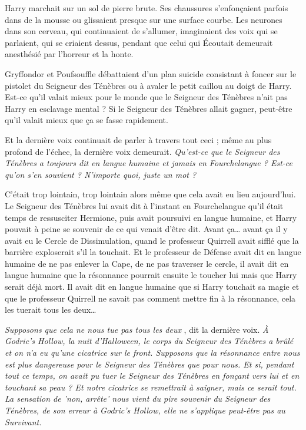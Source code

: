 Harry marchait sur un sol de pierre brute. Ses chaussures s'enfonçaient parfois dans de la mousse ou glissaient presque sur une surface courbe. Les neurones dans son cerveau, qui continuaient de s'allumer, imaginaient des voix qui se parlaient, qui se criaient dessus, pendant que celui qui Écoutait demeurait anesthésié par l'horreur et la honte.

Gryffondor et Poufsouffle débattaient d'un plan suicide consistant à foncer sur le pistolet du Seigneur des Ténèbres ou à avaler le petit caillou au doigt de Harry. Est-ce qu'il valait mieux pour le monde que le Seigneur des Ténèbres n'ait pas Harry en esclavage mental ? Si le Seigneur des Ténèbres allait gagner, peut-être qu'il valait mieux que ça se fasse rapidement.

Et la dernière voix continuait de parler à travers tout ceci ; même au plus profond de l'échec, la dernière voix demeurait. \emph{Qu'est-ce que le Seigneur des Ténèbres a toujours dit en langue humaine et jamais en Fourchelangue ? Est-ce qu'on s'en souvient ? N'importe quoi, juste un mot ?} 

C'était trop lointain, trop lointain alors même que cela avait eu lieu aujourd'hui. Le Seigneur des Ténèbres lui avait dit à l'instant en Fourchelangue qu'il était temps de ressusciter Hermione, puis avait poursuivi en langue humaine, et Harry pouvait à peine se souvenir de ce qui venait d'être dit. Avant ça… avant ça il y avait eu le Cercle de Dissimulation, quand le professeur Quirrell avait sifflé que la barrière exploserait s'il la touchait. Et le professeur de Défense avait dit en langue humaine de ne pas enlever la Cape, de ne pas traverser le cercle, il avait dit en langue humaine que la résonnance pourrait ensuite le toucher lui mais que Harry serait déjà mort. Il avait dit en langue humaine que si Harry touchait sa magie et que le professeur Quirrell ne savait pas comment mettre fin à la résonnance, cela les tuerait tous les deux…

\emph{Supposons que cela ne nous tue pas tous les deux} , dit la dernière voix. \emph{À Godric's Hollow, la nuit d'Halloween, le corps du Seigneur des Ténèbres a brûlé et on n'a eu qu'une cicatrice sur le front. Supposons que la résonnance entre nous est plus dangereuse pour le Seigneur des Ténèbres que pour nous. Et si, pendant tout ce temps, on avait pu tuer le Seigneur des Ténèbres en fonçant vers lui et en touchant sa peau ? Et notre cicatrice se remettrait à saigner, mais ce serait tout. La sensation de 'non, arrête' nous vient du pire souvenir du Seigneur des Ténèbres, de son erreur à Godric's Hollow, elle ne s'applique peut-être pas au Survivant.} 

